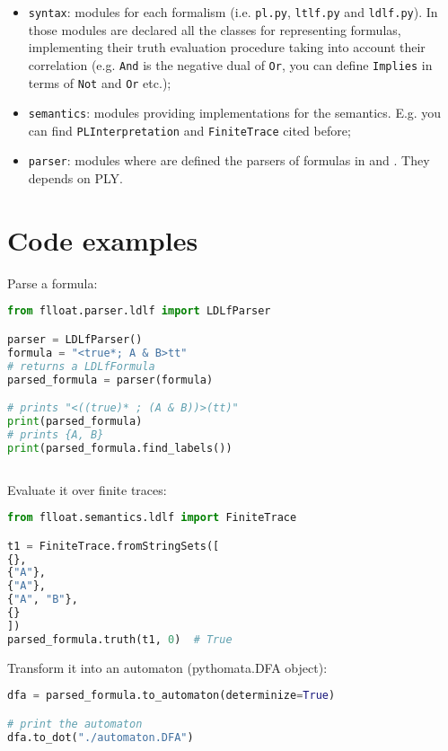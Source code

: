 \begin{itemize}
\begin{itemize}
	\end{itemize}
	\item \texttt{syntax}: modules for each formalism (i.e. \texttt{pl.py}, \texttt{ltlf.py} and \texttt{ldlf.py}). In those modules are declared all the classes for representing formulas, implementing their truth evaluation procedure  taking into account their correlation (e.g. \texttt{And} is the negative dual of \texttt{Or}, you can define \texttt{Implies} in terms of \texttt{Not} and \texttt{Or} etc.);
	\item \texttt{semantics}: modules providing implementations for the semantics. E.g. you can find \texttt{PLInterpretation} and \texttt{FiniteTrace} cited before;
	\item \texttt{parser}: modules where are defined the parsers of formulas in \PL and \LLf. They depends on PLY.
\end{itemize}

\section{Code examples}


Parse a \LDLf formula:

\begin{lstlisting}[language=Python, style=Python]
from flloat.parser.ldlf import LDLfParser

parser = LDLfParser()
formula = "<true*; A & B>tt"
# returns a LDLfFormula
parsed_formula = parser(formula)        

# prints "<((true)* ; (A & B))>(tt)"
print(parsed_formula)                   
# prints {A, B}
print(parsed_formula.find_labels())
     
\end{lstlisting}
Evaluate it over finite traces:

\begin{lstlisting}[language=Python, style=Python]
from flloat.semantics.ldlf import FiniteTrace

t1 = FiniteTrace.fromStringSets([
{},
{"A"},
{"A"},
{"A", "B"},
{}
])
parsed_formula.truth(t1, 0)  # True
\end{lstlisting}
Transform it into an automaton (pythomata.DFA object):

\begin{lstlisting}[language=Python, style=Python]
dfa = parsed_formula.to_automaton(determinize=True)

# print the automaton
dfa.to_dot("./automaton.DFA")
\end{lstlisting}

